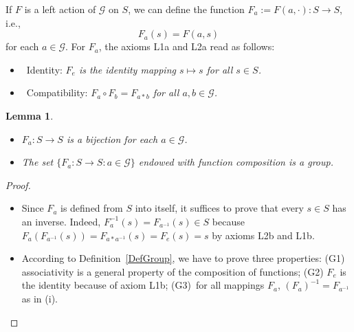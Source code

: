 \documentclass{article}
\newtheorem{lemma}[theorem]{Lemma}
\begin{document}
If $F$ is a left action of $\mathcal{G}$ on $S$, we can define the function $%
F_{a}:=F(a,\cdot ):S\rightarrow S$, i.e., 
\begin{equation}
F_{a}(s)=F(a,s)  \label{F_a}
\end{equation}%
for each $a\in \mathcal{G}$. For $F_{a}$, the axioms L1a and L2a read as
follows:

\begin{itemize}
\item[\textbf{(L1b)}]~Identity: \emph{$F_{e}$ is the identity mapping $s\mapsto s$ for all $%
s\in S$.}

\item[\textbf{(L2b)}]~Compatibility: \emph{$F_{a}\circ F_{b}=F_{a\ast b}$ for all $a,b\in 
\mathcal{G}$.}
\end{itemize}

\begin{lemma}
\label{LemmaAutGroup}

\begin{itemize}
\item[(i)] $F_{a}:S\rightarrow S$ is a bijection for each $a\in \mathcal{G}$. 

\item[(ii)] The set $\{F_{a}:S\rightarrow S:a\in \mathcal{G}\}$
endowed with function composition is a group.
\end{itemize}
\end{lemma}

\begin{proof}


\begin{itemize}
\item[(i)] Since $F_{a}$ is defined from $S$ into itself, it suffices to prove that
every $s\in S$ has an inverse. Indeed, $F_{a}^{-1}(s)=F_{a^{-1}}(s)\in S$
because $F_{a}(F_{a^{-1}}(s))=F_{a\ast a^{-1}}(s)=F_{e}(s)=s$ by axioms L2b
and L1b.

\item[(ii)] According to Definition~\ref{DefGroup}, we have to prove three
properties: (G1) associativity is a general property of the composition of
functions; (G2) $F_{e}$ is the identity because of axiom L1b; (G3)\ for all
mappings $F_{a}$, $(F_{a})^{-1}=F_{a^{-1}}$ as in (i).
\end{itemize}
\end{proof}
\end{document}
